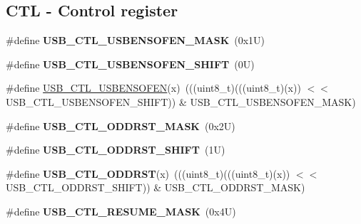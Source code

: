 \subsection*{C\+TL -\/ Control register}
\begin{DoxyCompactItemize}
\item 
\mbox{\label{group___u_s_b___register___masks_gaa406be72ac0b31143d3a3bc357af334b}} 
\#define {\bfseries U\+S\+B\+\_\+\+C\+T\+L\+\_\+\+U\+S\+B\+E\+N\+S\+O\+F\+E\+N\+\_\+\+M\+A\+SK}~(0x1\+U)
\item 
\mbox{\label{group___u_s_b___register___masks_ga674ca18da1675b8ae48c65ca4203da36}} 
\#define {\bfseries U\+S\+B\+\_\+\+C\+T\+L\+\_\+\+U\+S\+B\+E\+N\+S\+O\+F\+E\+N\+\_\+\+S\+H\+I\+FT}~(0\+U)
\item 
\#define \mbox{\hyperlink{group___u_s_b___register___masks_gafcc995142941dbf5985fdd3b4c21ca81}{U\+S\+B\+\_\+\+C\+T\+L\+\_\+\+U\+S\+B\+E\+N\+S\+O\+F\+EN}}(x)~(((uint8\+\_\+t)(((uint8\+\_\+t)(x)) $<$$<$ U\+S\+B\+\_\+\+C\+T\+L\+\_\+\+U\+S\+B\+E\+N\+S\+O\+F\+E\+N\+\_\+\+S\+H\+I\+FT)) \& U\+S\+B\+\_\+\+C\+T\+L\+\_\+\+U\+S\+B\+E\+N\+S\+O\+F\+E\+N\+\_\+\+M\+A\+SK)
\item 
\mbox{\label{group___u_s_b___register___masks_ga70907cc5c00bad68669ef02ec1332bfc}} 
\#define {\bfseries U\+S\+B\+\_\+\+C\+T\+L\+\_\+\+O\+D\+D\+R\+S\+T\+\_\+\+M\+A\+SK}~(0x2\+U)
\item 
\mbox{\label{group___u_s_b___register___masks_ga6e2ea6a3166748c567d22a767c69f98d}} 
\#define {\bfseries U\+S\+B\+\_\+\+C\+T\+L\+\_\+\+O\+D\+D\+R\+S\+T\+\_\+\+S\+H\+I\+FT}~(1\+U)
\item 
\mbox{\label{group___u_s_b___register___masks_ga108f100f640bfdf7ca2f4b2cd371126a}} 
\#define {\bfseries U\+S\+B\+\_\+\+C\+T\+L\+\_\+\+O\+D\+D\+R\+ST}(x)~(((uint8\+\_\+t)(((uint8\+\_\+t)(x)) $<$$<$ U\+S\+B\+\_\+\+C\+T\+L\+\_\+\+O\+D\+D\+R\+S\+T\+\_\+\+S\+H\+I\+FT)) \& U\+S\+B\+\_\+\+C\+T\+L\+\_\+\+O\+D\+D\+R\+S\+T\+\_\+\+M\+A\+SK)
\item 
\mbox{\label{group___u_s_b___register___masks_ga4e385fa5cf2157ef30a39c1c2b766cd3}} 
\#define {\bfseries U\+S\+B\+\_\+\+C\+T\+L\+\_\+\+R\+E\+S\+U\+M\+E\+\_\+\+M\+A\+SK}~(0x4\+U)

\end{DoxyCompactItemize}

